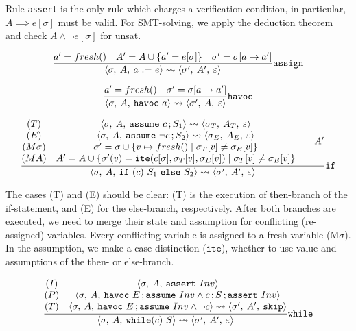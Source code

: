 \documentclass[a4paper]{article}
\DeclareMathOperator{\semi}{;}
\begin{document}
Rule \texttt{assert} is the only rule which charges a verification condition, in
particular, $A \implies e[\sigma]$ must be valid. For SMT-solving, we apply the
deduction theorem and check $A \wedge \neg e[\sigma]$ for unsat.

\begin{equation}
  \label{ex:1}
  \frac%
  {
    a'=fresh()
    \quad
    A' = A \cup \{a' = e[\sigma]\}
    \quad
    \sigma' = \sigma[a \to a']
  }%
  {
    \config\sigma A{a~\mathtt{:=}~e}
    \leadsto
    \config{\sigma'}{A'}{\epsilon}
  }\mathtt{assign}
\end{equation}

\begin{equation}
  \label{ex:1}
  \frac%
  {
    a'=fresh()
    \quad
    \sigma' = \sigma[a \to a']
  }%
  {
    \config\sigma A{\mathtt{havoc}~a}
    \leadsto
    \config{\sigma'}{A}{\epsilon}
  }\mathtt{havoc}
\end{equation}

\begin{equation}
  \label{ex:1}
  \frac%
  {
    \begin{matrix}
      (T) & \config\sigma A{\mathtt{assume}~c\semi S_1} \leadsto \config{\sigma_T}{A_T}{\epsilon}\\
      (E) & \config\sigma A{\mathtt{assume}~\neg c\semi S_2}\leadsto \config{\sigma_E}{A_E}{\epsilon}\\
      (M\sigma)& \sigma' = \sigma \cup \{ v \mapsto fresh() \mid \sigma_T[v] \neq \sigma_E[v] \}\\
      (MA)& A' = A \cup \{  \sigma'(v) = \mathtt{ite}(c[\sigma],  \sigma_T[v], \sigma_E[v])   \mid \sigma_T[v] \neq \sigma_E[v]  \}
    \end{matrix}
    \quad
    \quad
    A'
  }%
  {
    \config\sigma A{\mathtt{if}~(c)~S_1~\mathtt{else}~S_2}
    \leadsto
    \config{\sigma'}{A'}{\epsilon}
  }\mathtt{if}
\end{equation}

The cases (T) and (E) should be clear: (T) is the execution of then-branch of
the if-statement, and (E) for the else-branch, respectively. After both branches
are executed, we need to merge their state and assumption for conflicting
(re-assigned) variables. Every conflicting variable is assigned to a fresh
variable (M$\sigma$). In the assumption, we make a case distinction
($\mathtt{ite}$), whether to use value and assumptions of the then- or
else-branch.

\begin{equation}
  \label{ex:1}
  \frac%
  {
    \begin{matrix}
      (I) &\config{\sigma}{A%
      }{\mathtt{assert}~Inv}\\
      (P) &\config{\sigma}{A}{\mathtt{havoc}~E\semi\mathtt{assume}~Inv\land
        c\semi S\semi\mathtt{assert}~Inv}\\
      (T) &\config{\sigma}{A}{\mathtt{havoc}~E\semi\mathtt{assume}~Inv\land\neg
        c} \leadsto \config{\sigma'}{A'}{\mathtt{skip}}
    \end{matrix}
  }%
  {
    \config\sigma A{\mathtt{while}(c)~S}
    \leadsto
    \config{\sigma'}{A'}{\epsilon}
  }\mathtt{while}
\end{equation}
\end{document}
